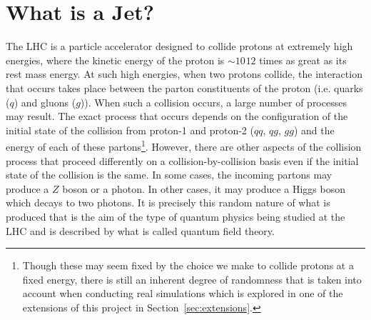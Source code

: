 \documentclass[UKenglish,texlive=2016]{\ATLASLATEXPATH atlasdoc}
\begin{document}
\section{What is a Jet?}
\label{sec:whatisjet}
The LHC is a particle accelerator designed to collide protons at extremely high energies, where the kinetic energy of the proton is $\sim10^{}12$ times as great as its rest mass energy.  At such high energies, when two protons collide, the interaction that occurs takes place between the parton constituents of the proton (i.e. quarks ($q$) and gluons ($g$)).  When such a collision occurs, a large number of processes may result.  The exact process that occurs depends on the configuration of the initial state of the collision from proton-1 and proton-2 ($qq$, $qg$, $gg$) and the energy of each of these partons\footnote{Though these may seem fixed by the choice we make to collide protons at a fixed energy, there is still an inherent degree of randomness that is taken into account when conducting real simulations which is explored in one of the extensions of this project in Section~\ref{sec:extensions}.}.  However, there are other aspects of the collision process that proceed differently on a collision-by-collision basis even if the initial state of the collision is the same.  In some cases, the incoming partons may produce a $Z$ boson or a photon.  In other cases, it may produce a Higgs boson which decays to two photons.  It is precisely this random nature of what is produced that is the aim of the type of quantum physics being studied at the LHC and is described by what is called quantum field theory.  
\end{document}
